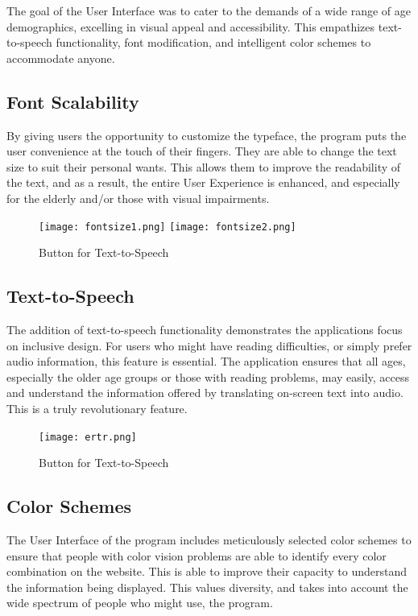 \documentclass{article}
\begin{document}
The goal of the User Interface was to cater to the demands of a wide range of age demographics, excelling in visual appeal and accessibility. This empathizes text-to-speech functionality, font modification, and intelligent color schemes to accommodate anyone. 

\subsection{Font Scalability}
By giving users the opportunity to customize the typeface, the program puts the user convenience at the touch of their fingers. They are able to change the text size to suit their personal wants. This allows them to improve the readability of the text, and as a result, the entire User Experience is enhanced, and especially for the elderly and/or those with visual impairments.
\begin{figure}[h]
    \centering
    \texttt{[image: fontsize1.png]}
    \texttt{[image: fontsize2.png]}
    \caption{Button for Text-to-Speech}
\end{figure}

\subsection{Text-to-Speech}
The addition of text-to-speech functionality demonstrates the applications focus on inclusive design. For users who might have reading difficulties, or simply prefer audio information, this feature is essential. The application ensures that all ages, especially the older age groups or those with reading problems, may easily, access and understand the information offered by translating on-screen text into audio. This is a truly revolutionary feature.
\begin{figure}[h]
    \centering
    \texttt{[image: ertr.png]}
    \caption{Button for Text-to-Speech}
\end{figure}



\subsection{Color Schemes}
The User Interface of the program includes meticulously selected color schemes to ensure that people with color vision problems are able to identify every color combination on the website. This is able to improve their capacity to understand the information being displayed. This values diversity, and takes into account the wide spectrum of people who might use, the program.
\end{document}
